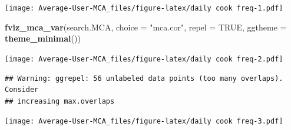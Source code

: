 \documentclass[
]{article}
\newenvironment{Shaded}{\begin{snugshade}}{\end{snugshade}}
\newcommand{\DataTypeTok}[1]{\textcolor[rgb]{0.13,0.29,0.53}{#1}}
\newcommand{\KeywordTok}[1]{\textcolor[rgb]{0.13,0.29,0.53}{\textbf{#1}}}
\newcommand{\NormalTok}[1]{#1}
\newcommand{\OtherTok}[1]{\textcolor[rgb]{0.56,0.35,0.01}{#1}}
\newcommand{\StringTok}[1]{\textcolor[rgb]{0.31,0.60,0.02}{#1}}
\begin{document}
\texttt{[image: Average-User-MCA\_files/figure-latex/daily cook freq-1.pdf]}

\begin{Shaded}
\begin{Highlighting}[]
\KeywordTok{fviz_mca_var}\NormalTok{(search.MCA, }\DataTypeTok{choice =} \StringTok{"mca.cor"}\NormalTok{, }\DataTypeTok{repel =} \OtherTok{TRUE}\NormalTok{,}
             \DataTypeTok{ggtheme =} \KeywordTok{theme_minimal}\NormalTok{())}
\end{Highlighting}
\end{Shaded}

\texttt{[image: Average-User-MCA\_files/figure-latex/daily cook freq-2.pdf]}

\begin{Shaded}
\end{Shaded}

\begin{verbatim}
## Warning: ggrepel: 56 unlabeled data points (too many overlaps). Consider
## increasing max.overlaps
\end{verbatim}

\texttt{[image: Average-User-MCA\_files/figure-latex/daily cook freq-3.pdf]}
\end{document}
